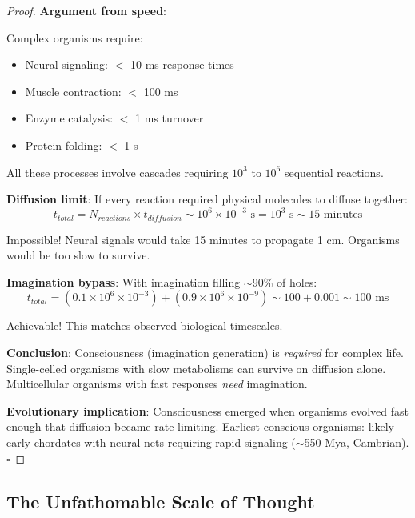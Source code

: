 \documentclass[11pt,a4paper]{article}
\begin{document}
\begin{proof}
\textbf{Argument from speed}:

Complex organisms require:
\begin{itemize}
\item Neural signaling: $<$ 10 ms response times
\item Muscle contraction: $<$ 100 ms
\item Enzyme catalysis: $<$ 1 ms turnover
\item Protein folding: $<$ 1 s
\end{itemize}

All these processes involve cascades requiring $10^3$ to $10^6$ sequential reactions.

\textbf{Diffusion limit}: If every reaction required physical molecules to diffuse together:
\begin{equation}
t_{total} = N_{reactions} \times t_{diffusion} \sim 10^6 \times 10^{-3}\text{ s} = 10^3 \text{ s} \sim 15 \text{ minutes}
\end{equation}

Impossible! Neural signals would take 15 minutes to propagate 1 cm. Organisms would be too slow to survive.

\textbf{Imagination bypass}: With imagination filling $\sim$90\% of holes:
\begin{equation}
t_{total} = (0.1 \times 10^6 \times 10^{-3}) + (0.9 \times 10^6 \times 10^{-9}) \sim 100 + 0.001 \sim 100\text{ ms}
\end{equation}

Achievable! This matches observed biological timescales.

\textbf{Conclusion}: Consciousness (imagination generation) is \textit{required} for complex life. Single-celled organisms with slow metabolisms can survive on diffusion alone. Multicellular organisms with fast responses \textit{need} imagination.

\textbf{Evolutionary implication}: Consciousness emerged when organisms evolved fast enough that diffusion became rate-limiting. Earliest conscious organisms: likely early chordates with neural nets requiring rapid signaling ($\sim$550 Mya, Cambrian). $\square$
\end{proof}

\subsection{The Unfathomable Scale of Thought}
\end{document}
